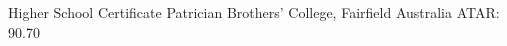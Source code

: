 \documentclass[11pt,a4paper,sans]{moderncv}        %
\begin{document}
{Higher School Certificate}
{Patrician Brothers' College, Fairfield}
{Australia}
{ATAR: 90.70}
{}







\end{document}
